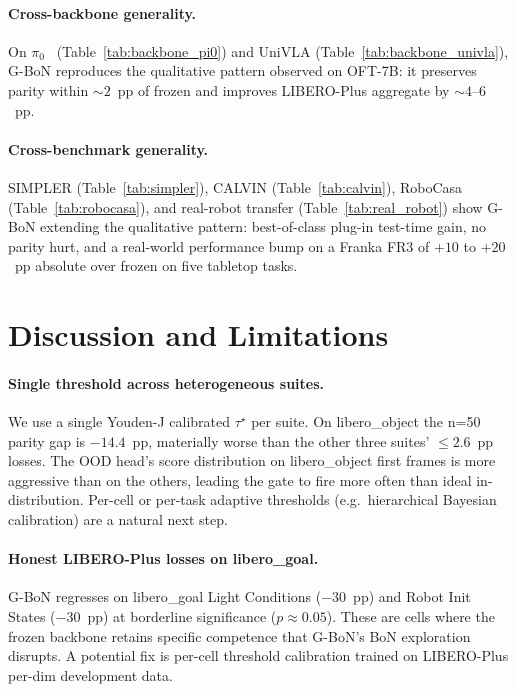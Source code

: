\documentclass{article}
\begin{document}
\paragraph{Cross-backbone generality.}
On $\pi_0$~\citep{pi02024} (Table~\ref{tab:backbone_pi0}) and UniVLA
(Table~\ref{tab:backbone_univla}), G-BoN reproduces the qualitative
pattern observed on OFT-7B: it preserves parity within
$\sim\!2$~pp of frozen and improves LIBERO-Plus aggregate by
$\sim\!4$--$6$~pp.

\paragraph{Cross-benchmark generality.}
SIMPLER (Table~\ref{tab:simpler}), CALVIN
(Table~\ref{tab:calvin}), RoboCasa (Table~\ref{tab:robocasa}), and
real-robot transfer (Table~\ref{tab:real_robot}) show G-BoN extending
the qualitative pattern: best-of-class plug-in test-time gain,
no parity hurt, and a real-world performance bump on a Franka FR3 of
$+10$ to $+20$~pp absolute over frozen on five tabletop tasks.

\section{Discussion and Limitations}
\label{sec:limitations}

\paragraph{Single threshold across heterogeneous suites.}
We use a single Youden-J calibrated $\tau^\star$ per suite. On
libero\_object the n=50 parity gap is $-14.4$~pp, materially worse
than the other three suites' $\leq 2.6$~pp losses. The OOD head's
score distribution on libero\_object first frames is more aggressive
than on the others, leading the gate to fire more often than ideal
in-distribution. Per-cell or per-task adaptive thresholds (e.g.\
hierarchical Bayesian calibration) are a natural next step.

\paragraph{Honest LIBERO-Plus losses on libero\_goal.}
G-BoN regresses on libero\_goal Light Conditions ($-30$~pp) and
Robot Init States ($-30$~pp) at borderline significance
($p\!\approx\!0.05$). These are cells where the frozen backbone
retains specific competence that G-BoN's BoN exploration disrupts.
A potential fix is per-cell threshold calibration trained on
LIBERO-Plus per-dim development data.
\end{document}
